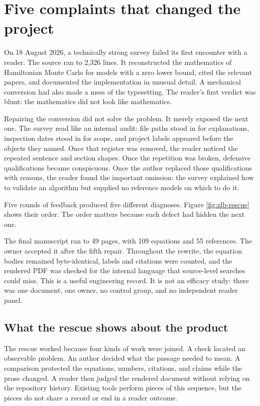 \chapter*{Five complaints that changed the project}

On 18 August 2026, a technically strong survey failed its first encounter with
a reader. The source ran to 2,326 lines. It reconstructed the mathematics of
Hamiltonian Monte Carlo for models with a zero lower bound, cited the relevant
papers, and documented the implementation in unusual detail. A mechanical
conversion had also made a mess of the typesetting. The reader's first verdict
was blunt: the mathematics did not look like mathematics.

Repairing the conversion did not solve the problem. It merely exposed the next
one. The survey read like an internal audit: file paths stood in for
explanations, inspection dates stood in for scope, and project labels appeared
before the objects they named. Once that register was removed, the reader
noticed the repeated sentence and section shapes. Once the repetition was
broken, defensive qualifications became conspicuous. Once the author replaced
those qualifications with reasons, the reader found the important omission:
the survey explained how to validate an algorithm but supplied no reference
models on which to do it.

Five rounds of feedback produced five different diagnoses. Figure
\ref{fig:zlb-rescue} shows their order. The order matters because each defect
had hidden the next one.

\hvFigureZLBRescue

The final manuscript ran to 49 pages, with 109 equations and 55 references.
The owner accepted it after the fifth repair. Throughout the rewrite, the
equation bodies remained byte-identical, labels and citations were counted,
and the rendered PDF was checked for the internal language that source-level
searches could miss. This is a useful engineering record. It is not an efficacy
study: there was one document, one owner, no control group, and no independent
reader panel.

\section*{What the rescue shows about the product}

The rescue worked because four kinds of work were joined. A check located an
observable problem. An author decided what the passage needed to mean. A
comparison protected the equations, numbers, citations, and claims while the
prose changed. A reader then judged the rendered document without relying on
the repository history. Existing tools perform pieces of this sequence, but
the pieces do not share a record or end in a reader outcome.

